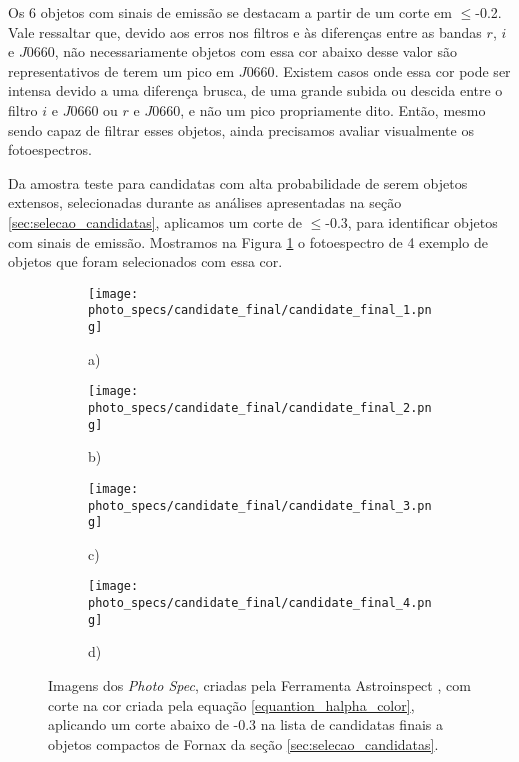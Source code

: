 
Os 6 objetos com sinais de emissão se destacam a partir de um corte em $\leq$-0.2. Vale ressaltar que, devido aos erros nos filtros e às diferenças entre as bandas $r$, $i$ e $J0660$, não necessariamente objetos com essa cor abaixo desse valor são representativos de terem um pico em $J0660$. Existem casos onde essa cor pode ser intensa devido a uma diferença brusca, de uma grande subida ou descida entre o filtro $i$ e $J0660$ ou $r$ e $J0660$, e não um pico propriamente dito. Então, mesmo sendo capaz de filtrar esses objetos, ainda precisamos avaliar visualmente os fotoespectros.

Da amostra teste para candidatas com alta probabilidade de serem objetos extensos, selecionadas durante as análises apresentadas na seção \ref{sec:selecao_candidatas}, aplicamos um corte de $\leq$-0.3, para identificar objetos com sinais de emissão. Mostramos na Figura \ref{halpha_candidatas_final} o fotoespectro de 4 exemplo de objetos que foram selecionados com essa cor.

\begin{figure}[!ht]
    \centering
    \captionsetup{justification=centering}
    \begin{subfigure}[b]{0.45\textwidth}
        \texttt{[image: photo\_specs/candidate\_final/candidate\_final\_1.png]}
        \caption{a)}
    \end{subfigure}
    \begin{subfigure}[b]{0.45\textwidth}
        \texttt{[image: photo\_specs/candidate\_final/candidate\_final\_2.png]}
        \caption{b)}
    \end{subfigure}
    \begin{subfigure}[b]{0.45\textwidth}
        \texttt{[image: photo\_specs/candidate\_final/candidate\_final\_3.png]}
        \caption{c)}
    \end{subfigure}
    \begin{subfigure}[b]{0.45\textwidth}
        \texttt{[image: photo\_specs/candidate\_final/candidate\_final\_4.png]}
        \caption{d)}
    \end{subfigure}
    \caption{Imagens dos \textit{Photo Spec}, criadas pela Ferramenta Astroinspect \cite{astroinspect}, com corte na cor criada pela equação \ref{equantion_halpha_color}, aplicando um corte abaixo de -0.3 na lista de candidatas finais a objetos compactos de Fornax da seção \ref{sec:selecao_candidatas}.}
    \label{halpha_candidatas_final}
\end{figure}

